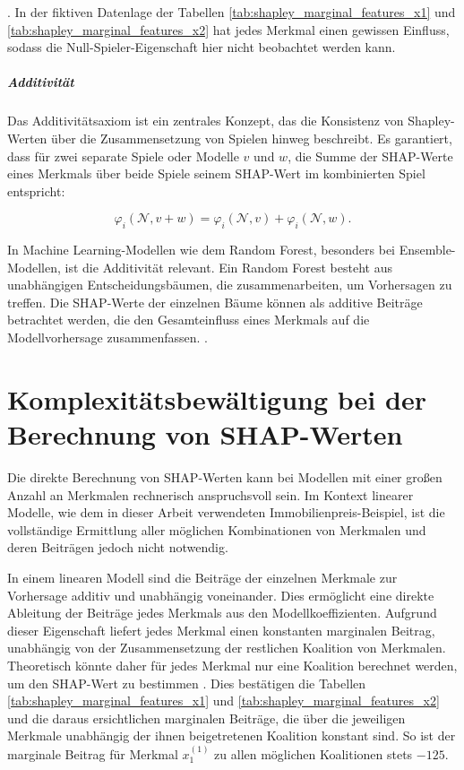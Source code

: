 \cite[S. 222]{Molnar_2022}. In der fiktiven Datenlage der Tabellen \ref{tab:shapley_marginal_features_x1} und \ref{tab:shapley_marginal_features_x2} hat jedes Merkmal 
einen gewissen Einfluss, sodass die Null-Spieler-Eigenschaft hier nicht beobachtet werden kann.

\paragraph{Additivität}

Das Additivitätsaxiom ist ein zentrales Konzept, das die Konsistenz von Shapley-Werten 
über die Zusammensetzung von Spielen hinweg beschreibt. Es garantiert, 
dass für zwei separate Spiele oder Modelle \(v\) und \(w\), die Summe der SHAP-Werte eines 
Merkmals über beide Spiele seinem SHAP-Wert im kombinierten Spiel entspricht:

\begin{equation}
    \varphi_i(\mathcal{N}, v + w) = \varphi_i (\mathcal{N}, v) + \varphi_i (\mathcal{N}, w).
\end{equation}

In Machine Learning-Modellen wie dem Random Forest, besonders bei Ensemble-Modellen, 
ist die Additivität relevant. Ein Random Forest besteht aus unabhängigen Entscheidungsbäumen, 
die zusammenarbeiten, um Vorhersagen zu treffen. Die SHAP-Werte der einzelnen Bäume 
können als additive Beiträge betrachtet werden, die den Gesamteinfluss eines Merkmals 
auf die Modellvorhersage zusammenfassen. \cite[S. 32]{Molnar_2023}.

\chapter{Komplexitätsbewältigung bei der Berechnung von SHAP-Werten}
\label{sec:estimators}

Die direkte Berechnung von SHAP-Werten kann bei Modellen mit einer 
großen Anzahl an Merkmalen rechnerisch anspruchsvoll sein. Im Kontext linearer Modelle, 
wie dem in dieser Arbeit verwendeten Immobilienpreis-Beispiel, 
ist die vollständige Ermittlung aller möglichen Kombinationen von Merkmalen und deren 
Beiträgen jedoch nicht notwendig. 

In einem linearen Modell sind die Beiträge der einzelnen Merkmale zur Vorhersage additiv 
und unabhängig voneinander. Dies ermöglicht eine direkte Ableitung der Beiträge 
jedes Merkmals aus den Modellkoeffizienten. Aufgrund dieser Eigenschaft 
liefert jedes Merkmal einen konstanten marginalen Beitrag, 
unabhängig von der Zusammensetzung der restlichen Koalition von Merkmalen. 
Theoretisch könnte daher für jedes Merkmal nur eine Koalition berechnet werden, 
um den SHAP-Wert zu bestimmen \cite[S. 38]{Molnar_2023}. Dies bestätigen die
Tabellen \ref{tab:shapley_marginal_features_x1} und \ref{tab:shapley_marginal_features_x2}
und die daraus ersichtlichen marginalen Beiträge, die über die jeweiligen Merkmale
unabhängig der ihnen beigetretenen Koalition konstant sind. So ist der marginale Beitrag für Merkmal $x_1^{(1)}$
zu allen möglichen Koalitionen stets $-125$.

